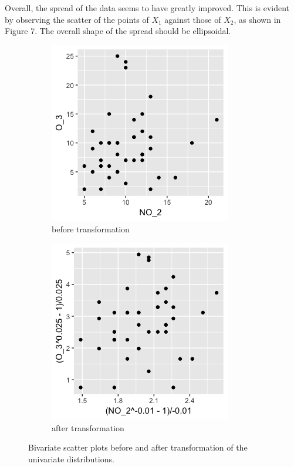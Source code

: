 Overall, the spread of the data seems to have greatly improved. This is evident by observing the scatter of the points of $X_1$ against those of $X_2$, as shown in Figure 7. The overall shape of the spread should be ellipsoidal.
\begin{figure}[H]
\begin{subfigure}{.5\textwidth}
  \centering
  \includegraphics[width=.8\linewidth]{plot_4_29_X1X2scatter.png}
  \caption{before transformation}
  \label{fig:sfig1}
\end{subfigure}%
\begin{subfigure}{.5\textwidth}
  \centering
  \includegraphics[width=.8\linewidth]{plot_4_29_X1X2newscatter.png}
  \caption{after transformation}
  \label{fig:sfig2}
\end{subfigure}
\caption{Bivariate scatter plots before and after transformation of the univariate distributions.}
\end{figure}


